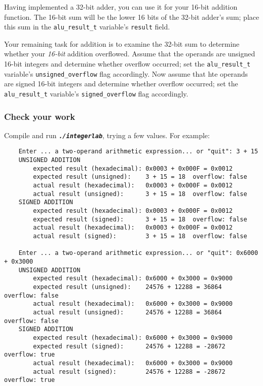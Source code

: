 Having implemented a 32-bit adder, you can use it for your 16-bit addition function.
The 16-bit sum will be the lower 16 bits of the 32-bit adder's sum;
place this sum in the \lstinline{alu_result_t} variable's \lstinline{result} field.

Your remaining task for addition is to examine the 32-bit sum to determine whether your \textit{16-bit} addition overflowed.
Assume that the operands are unsigned 16-bit integers and determine whether overflow occurred;
set the \lstinline{alu_result_t} variable's \lstinline{unsigned_overflow} flag accordingly.
Now assume that hte operands are signed 16-bit integers and determine whether overflow occurred;
set the \lstinline{alu_result_t} variable's \lstinline{signed_overflow} flag accordingly.


\subsubsection*{Check your work}

Compile and run \texttt{\textbf{\textit{./integerlab}}}, trying a few values.
For example:
\begin{verbatim}
    Enter ... a two-operand arithmetic expression... or "quit": 3 + 15
    UNSIGNED ADDITION
        expected result (hexadecimal): 0x0003 + 0x000F = 0x0012
        expected result (unsigned):    3 + 15 = 18	overflow: false
        actual result (hexadecimal):   0x0003 + 0x000F = 0x0012
        actual result (unsigned):      3 + 15 = 18	overflow: false
    SIGNED ADDITION
        expected result (hexadecimal): 0x0003 + 0x000F = 0x0012
        expected result (signed):      3 + 15 = 18	overflow: false
        actual result (hexadecimal):   0x0003 + 0x000F = 0x0012
        actual result (signed):        3 + 15 = 18	overflow: false

    Enter ... a two-operand arithmetic expression... or "quit": 0x6000 + 0x3000
    UNSIGNED ADDITION
        expected result (hexadecimal): 0x6000 + 0x3000 = 0x9000
        expected result (unsigned):    24576 + 12288 = 36864	overflow: false
        actual result (hexadecimal):   0x6000 + 0x3000 = 0x9000
        actual result (unsigned):      24576 + 12288 = 36864	overflow: false
    SIGNED ADDITION
        expected result (hexadecimal): 0x6000 + 0x3000 = 0x9000
        expected result (signed):      24576 + 12288 = -28672	overflow: true
        actual result (hexadecimal):   0x6000 + 0x3000 = 0x9000
        actual result (signed):        24576 + 12288 = -28672	overflow: true
\end{verbatim}

